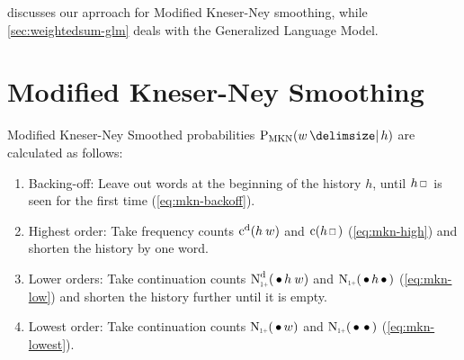  discusses our aprroach for Modified Kneser-Ney
smoothing, while \cref{sec:weightedsum-glm} deals with the Generalized
Language Model.


\clearpage
\section{Modified Kneser-Ney Smoothing}
\label{sec:weightedsum-mkn}

Modified Kneser-Ney Smoothed probabilities $\ProbMKN{w}{h}$ are calculated as
follows:
\begin{enumerate}
  \item Backing-off: Leave out words at the beginning of the history $h$, until
    $h \Skp$ is seen for the first time (\cref{eq:mkn-backoff}).
  \item Highest order: Take frequency counts $\DiscountedCount(h \: w)$ and
    $\Count(h \Skp)$ (\cref{eq:mkn-high}) and shorten the history by one word.
  \item Lower orders: Take continuation counts $\DiscountedCount*(\WSkp h \: w)$
    and $\ContCountIp(\WSkp h \WSkp)$ (\cref{eq:mkn-low}) and shorten the
    history further until it is empty.
  \item Lowest order: Take continuation counts $\ContCountIp(\WSkp w)$ and
    $\ContCountIp(\WSkp \WSkp)$ (\cref{eq:mkn-lowest}).
\end{enumerate}

\newcommand{\ProbMKNcab}[1]
  {\frac{\DiscountedCount(w_1 w_2 w_3) + \gamma(w_1 w_2) #1}{\Count(w_1 w_2 \Skp)}}
\newcommand{\ProbMKNcb}[1]
  {\frac{\DiscountedCount*(\WSkp w_2 w_3) + \gamma(w_2) #1}{\ContCountIp(\WSkp w_2 \WSkp)}}
\newcommand{\ProbMKNc}
  {\frac{\ContCountIp(\WSkp w_3)}{\ContCountIp(\text{\WSkp \WSkp})}}

